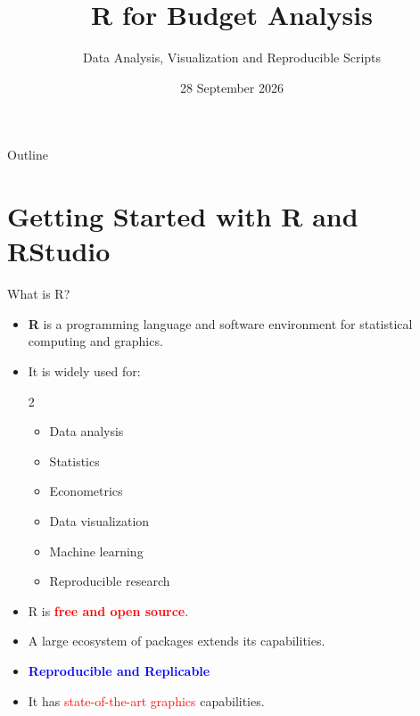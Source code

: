 \documentclass[aspectratio=169,11pt]{beamer}
\title{R for Budget Analysis}
\subtitle{Data Analysis, Visualization and Reproducible Scripts}
\author{}
\institute{Finance Division\\Ministry of Finance, Bangladesh}
\date{28 September 2026}
\begin{document}
	
	\begin{frame}
		\titlepage
	\end{frame}
	
	\begin{frame}{Outline}
		
		\tableofcontents
		
	\end{frame}
	
	\section{Getting Started with R and RStudio}
	
	\begin{frame}{What is R?}
		
		\begin{itemize}
			\item \textbf{R} is a programming language and software environment
			for statistical computing and graphics.
			
			\item It is widely used for:
			\begin{multicols}{2}	
			\begin{itemize}
				\item Data analysis
				\item Statistics
				\item Econometrics
				\item Data visualization
				\item Machine learning
				\item Reproducible research
			\end{itemize}
			\end{multicols}
			
			\item R is \textcolor{red}{\textbf{free and open source}}.
			
			\item A large ecosystem of packages extends its capabilities.
			
			\item \textcolor{blue} {\textbf{Reproducible and Replicable}}
			
			\item It has \textcolor{red} { state-of-the-art graphics} capabilities.
			
		\end{itemize}
		
	\end{frame}
	
\end{document}

